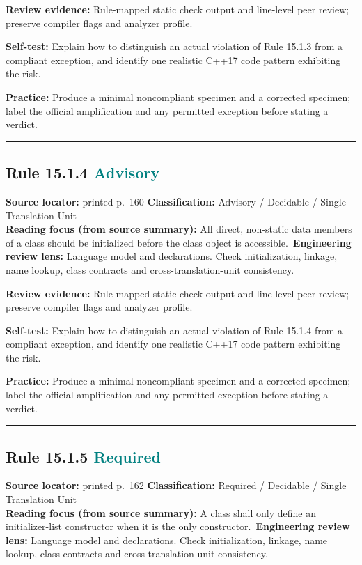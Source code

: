 \documentclass[10pt,letterpaper]{article}
\begin{document}
\textbf{Review evidence:} Rule-mapped static check output and line-level peer review; preserve compiler flags and analyzer profile.

\textbf{Self-test:} Explain how to distinguish an actual violation of Rule 15.1.3 from a compliant exception, and identify one realistic C++17 code pattern exhibiting the risk.\par
\textbf{Practice:} Produce a minimal noncompliant specimen and a corrected specimen; label the official amplification and any permitted exception before stating a verdict.
\smallskip\hrule\smallskip
\subsection*{Rule 15.1.4 \enspace \texorpdfstring{\small\textcolor{teal}{Advisory}}{Advisory}}
\noindent\textbf{Source locator:} printed p.~160 \quad\textbf{Classification:} Advisory / Decidable / Single Translation Unit\\
\textbf{Reading focus (from source summary):} All direct, non-static data members of a class should be initialized before the class object is accessible.\
\textbf{Engineering review lens:} Language model and declarations. Check initialization, linkage, name lookup, class contracts and cross-translation-unit consistency.

\textbf{Review evidence:} Rule-mapped static check output and line-level peer review; preserve compiler flags and analyzer profile.

\textbf{Self-test:} Explain how to distinguish an actual violation of Rule 15.1.4 from a compliant exception, and identify one realistic C++17 code pattern exhibiting the risk.\par
\textbf{Practice:} Produce a minimal noncompliant specimen and a corrected specimen; label the official amplification and any permitted exception before stating a verdict.
\smallskip\hrule\smallskip
\subsection*{Rule 15.1.5 \enspace \texorpdfstring{\small\textcolor{teal}{Required}}{Required}}
\noindent\textbf{Source locator:} printed p.~162 \quad\textbf{Classification:} Required / Decidable / Single Translation Unit\\
\textbf{Reading focus (from source summary):} A class shall only define an initializer-list constructor when it is the only constructor.\
\textbf{Engineering review lens:} Language model and declarations. Check initialization, linkage, name lookup, class contracts and cross-translation-unit consistency.
\end{document}
